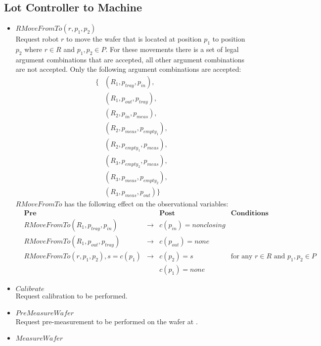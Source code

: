 \subsection{Lot Controller to Machine}
\begin{itemize}
\item $\mathit{RMoveFromTo}(r, p_1, p_2)$
\\Request robot $r$ to move the wafer that is located at position $p_1$ to position $p_2$ where $r \in R$ and $p_1, p_2 \in P$.
For these movements there is a set of legal argument combinations that are accepted, all other argument combinations are not accepted.
Only the following argument combinations are accepted:
\begin{align*}
\{ & (R_1, p_\mathit{tray}, p_\mathit{in}),&\\
& (R_1, p_\mathit{out}, p_\mathit{tray}),&\\
&(R_2, p_\mathit{in}, p_\mathit{meas}),&\\
&(R_2, p_\mathit{meas}, p_{\mathit{empty}_1}),&\\
&(R_2, p_{\mathit{empty}_1}, p_\mathit{meas}),&\\
&(R_3, p_{\mathit{empty}_2}, p_\mathit{meas}),&\\
&(R_3, p_\mathit{meas}, p_{\mathit{empty}_2}),&\\
&(R_3, p_\mathit{meas}, p_\mathit{out})\}
\end{align*}
$\mathit{RMoveFromTo}$ has the following effect on the observational variables: 
\begin{align*}
&\textbf{Pre}&&\textbf{Post}&\textbf{Conditions}&\\
&\mathit{RMoveFromTo}(R_1, p_\mathit{tray}, p_\mathit{in})&\rightarrow&c(p_\mathit{in}) = \mathit{nonclosing}&&\\
&\mathit{RMoveFromTo}(R_1, p_\mathit{out}, p_\mathit{tray})&\rightarrow&c(p_\mathit{out}) = \mathit{none}&&\\
&\mathit{RMoveFromTo}(r, p_1, p_2), s = c(p_1)&\rightarrow&c(p_2) = s&\text{for any }r \in R\text{ and }p_1,p_2 \in P&\\
&&&c(p_1)=none&&
\end{align*}
\item $\mathit{Calibrate}$
\\Request calibration to be performed.
\item $\mathit{PreMeasureWafer}$
\\Request pre-measurement to be performed on the wafer at \chuckIn.
\item $\mathit{MeasureWafer}$

\end{itemize}
